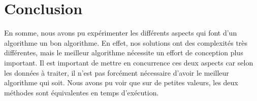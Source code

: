 \documentclass[a4paper, titlepage]{article}
\begin{document}
\section{Conclusion}

En somme, nous avons pu expérimenter les différents aspects qui font d'un algorithme un bon algorithme.
En effet, nos solutions ont des complexités très différentes, mais le meilleur algorithme nécessite un effort de conception plus important.
Il est important de mettre en concurrence ces deux aspects car selon les données à traiter, il n'est pas forcément nécessaire d'avoir le meilleur algorithme qui soit.
Nous avons pu voir que sur de petites valeurs, les deux méthodes sont équivalentes en temps d'exécution.
\end{document}
